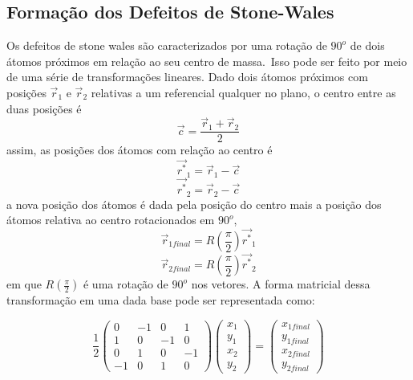 \subsection{Formação dos Defeitos de Stone-Wales}

Os defeitos de stone wales são caracterizados por uma rotação de $90^o$ de dois átomos próximos em relação ao seu centro de massa.\
Isso pode ser feito por meio de uma série de transformações lineares. Dado dois átomos próximos com posições $\vec{r}_1$ e $\vec{r}_2$ relativas a um referencial qualquer no plano,
o centro entre as duas posições é
\begin{equation}
    \vec{c} = \frac{\vec{r}_1 + \vec{r}_2}{2}
\end{equation}
assim, as posições dos átomos com relação ao centro é
\begin{equation}
    \vec{r^*}_1  = \vec{r}_1 - \vec{c}
\end{equation}
\begin{equation}
    \vec{r^*}_2 = \vec{r}_2 - \vec{c}
\end{equation}
a nova posição dos átomos é dada pela posição do centro mais a posição dos átomos relativa ao centro rotacionados em $90^o$,
\begin{equation}
    \vec{r}_{1 final}  = R\left(\frac{\pi}{2}\right)\vec{r^*}_1
\end{equation}
\begin{equation}
    \vec{r}_{2 final}  = R\left(\frac{\pi}{2}\right)\vec{r^*}_2
\end{equation}
em que $R\left(\frac{\pi}{2}\right)$ é uma rotação de $90^o$ nos vetores. A forma matricial dessa transformação em uma dada base pode ser representada como:

\[
\frac{1}{2}\begin{pmatrix}
0 & -1 & 0 & 1 \\
1 & 0 & -1 & 0 \\
0 & 1 & 0 & -1 \\
-1 & 0 & 1 & 0
\end{pmatrix}
\begin{pmatrix}
x_1 \\
y_1 \\
x_2 \\
y_2
\end{pmatrix}
=
\begin{pmatrix}
x_{1 final} \\
y_{1 final} \\
x_{2 final} \\
y_{2 final}
\end{pmatrix}
\]

